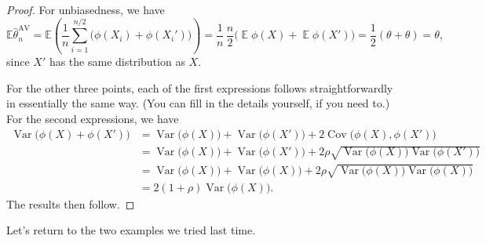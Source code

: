 \documentclass[
  letterpaper,
  DIV=11,
  numbers=noendperiod]{scrreprt}
\newcommand{\Exg}{\operatorname{\mathbb{E}}}
\newcommand{\Ex}{\mathbb{E}}
\newcommand{\Var}{\operatorname{Var}}
\theoremstyle{plain}
\theoremstyle{definition}
\theoremstyle{definition}
\theoremstyle{remark}
\begin{document}
\begin{proof}
For unbiasedness, we have
\[ \Ex \widehat{\theta}_n^{\mathrm{AV}} = \Ex \left(\frac{1}{n} \sum_{i=1}^{n/2} \big(\phi(X_i) + \phi(X_i')\big)\right) = \frac{1}{n} \,\frac{n}{2} \big(\Exg\phi(X) + \Exg \phi(X')) = \frac{1}{2}(\theta+ \theta) = \theta ,\]
since \(X'\) has the same distribution as \(X\).

For the other three points, each of the first expressions follows
straightforwardly in essentially the same way. (You can fill in the
details yourself, if you need to.) For the second expressions, we have
\begin{align*}
\Var \big(\phi(X) + \phi(X')\big)
&= \Var\big(\phi(X)\big) + \Var\big(\phi(X')\big) + 2\operatorname{Cov}\big(\phi(X),\phi(X')\big) \\
&= \Var\big(\phi(X)\big) + \Var\big(\phi(X')\big) + 2\rho\sqrt{\Var\big(\phi(X)\big) \Var\big(\phi(X')\big)} \\
&= \Var\big(\phi(X)\big) + \Var\big(\phi(X)\big) + 2\rho\sqrt{\Var\big(\phi(X)\big) \Var\big(\phi(X)\big)} \\
&= 2(1+\rho)\Var\big(\phi(X)\big) .
\end{align*} The results then follow.
\end{proof}

Let's return to the two examples we tried last time.
\end{document}
